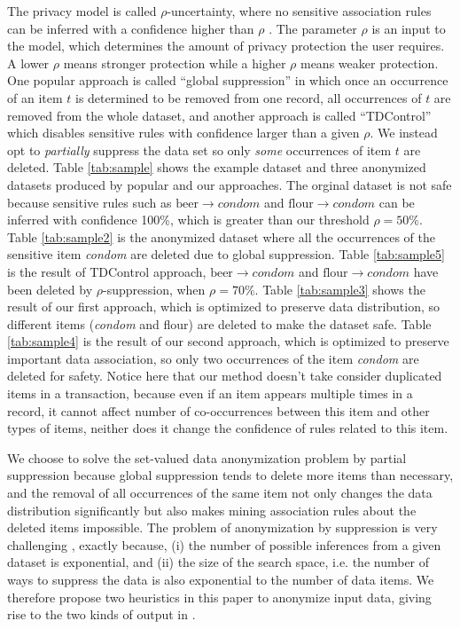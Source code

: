 The privacy model is called $\rho$-uncertainty, where
no sensitive association rules can be inferred with a confidence higher than
$\rho$ \cite{Cao:2010:rho}. The parameter $\rho$ is an input to the model,
which determines the amount of privacy protection the user requires. 
A lower $\rho$ means stronger protection while a higher $\rho$ means weaker
protection. 
%
One popular approach is called ``global suppression'' in which once an occurrence of an item $t$ is determined to be removed from one record, all occurrences of $t$ are removed from the whole dataset, and another approach is called 
``TDControl'' \cite{Cao:2010:rho} which disables sensitive rules with confidence 
larger than a given $\rho$. We instead opt to {\em partially} suppress the data set so only {\em some} occurrences of item $t$ are deleted. Table \ref{tab:sample} shows the example dataset
and three anonymized datasets produced by popular and our approaches.
The orginal dataset is not safe because sensitive rules such as
$\text{beer} \rightarrow condom$ and $\text{flour} \rightarrow condom$
can be inferred with confidence 100\%, which is greater than our threshold $\rho=50\%$.
Table \ref{tab:sample2} is the anonymized dataset where all the occurrences of the sensitive item {\em condom} are deleted due to global suppression. Table \ref{tab:sample5} is the result of TDControl approach, $\text{beer} \rightarrow condom$ and $\text{flour} \rightarrow condom$ have been deleted by $\rho$-suppression, when $\rho=70\%$.
Table \ref{tab:sample3} shows the result of our first
approach, which is optimized to preserve data distribution, so different
items ({\em condom} and flour) are deleted to make the dataset safe.
Table \ref{tab:sample4} is the result of our second approach, which is optimized
to preserve important data association, so only
two occurrences of the item {\em condom} are deleted for safety. Notice here that our method doesn't take consider duplicated items in a transaction,
because even if an item appears multiple times in a record, it cannot affect number of co-occurrences
between this item and other types of items, neither does it change 
the confidence of rules related to this item. 

We choose to solve the set-valued data anonymization problem by partial
suppression because global suppression tends to
delete more items than necessary,
and the removal of all occurrences of the same item not only changes the
data distribution significantly but also makes mining association rules
about the deleted items impossible.
%
The problem of anonymization by suppression is very
challenging \cite{atallah99:disclosure,Xu:2008:ATD}, exactly because, (i) the number of possible inferences from
a given dataset is exponential, and (ii) the size of the search space, i.e.
the number of ways to suppress the data is also exponential to the number of
data items. We therefore propose two heuristics in this paper to anonymize
input data, giving rise to the two kinds of output in .

